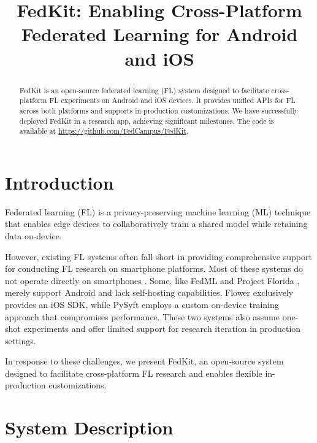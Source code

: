 \documentclass[letterpaper]{article} %
\title{FedKit: Enabling Cross-Platform Federated Learning for Android and iOS}
\author{}
\begin{document}
\maketitle

\begin{abstract}
    FedKit is an open-source federated learning (FL) system designed to
    facilitate cross-platform FL experiments on Android and iOS devices.
    It provides unified APIs for FL across both platforms and supports
    in-production customizations.
    We have successfully deployed FedKit in a research app,
    achieving significant milestones.
    The code is available at \url{https://github.com/FedCampus/FedKit}.
\end{abstract}

\section{Introduction}

Federated learning (FL) \cite{mcmahan2017communication}
is a privacy-preserving machine learning (ML) technique
that enables edge devices to collaboratively train a shared model while
retaining data on-device.

However, existing FL systems often fall short in
providing comprehensive support for conducting FL research on
smartphone platforms.
Most of these systems do not operate directly on smartphones
\cite[e.g.,][]{bonawitz2019towards,liu2021fate,ma2019paddlepaddle,openfl_citation}.
Some, like FedML \cite{he2020fedml} and
Project Florida \cite{madrigal2023project},
merely support Android and lack self-hosting capabilities.
Flower \cite{beutel2020flower,mathur2021ondevice} exclusively provides
an iOS SDK,
while PySyft \cite{ryffel2018generic,Ziller2021,hall2021syft} employs
a custom on-device training approach that compromises performance.
These two systems also assume one-shot experiments and
offer limited support for research iteration in production settings.

In response to these challenges, we present FedKit,
an open-source system designed to facilitate cross-platform FL research and
enables flexible in-production customizations.

\section{System Description}
\end{document}
